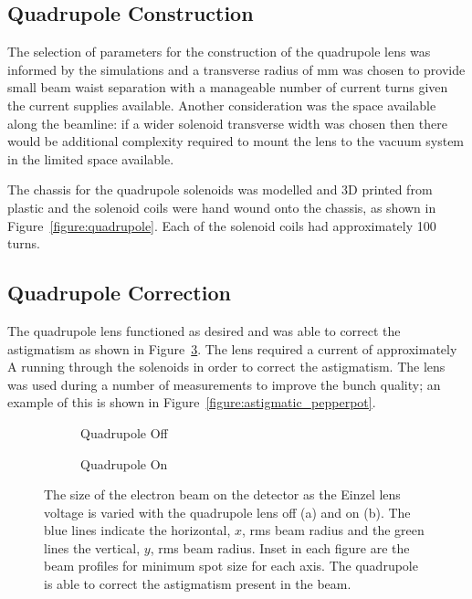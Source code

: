 \subsection{Quadrupole Construction}

The selection of parameters for the construction of the quadrupole lens was informed by the simulations and a transverse radius of \unit[35]{mm} was chosen to provide small beam waist separation with a manageable number of current turns given the current supplies available.
Another consideration was the space available along the beamline: if a wider solenoid transverse width was chosen then there would be additional complexity required to mount the lens to the vacuum system in the limited space available.

The chassis for the quadrupole solenoids was modelled and 3D printed from plastic and the solenoid coils were hand wound onto the chassis, as shown in Figure~\ref{figure:quadrupole}.
Each of the solenoid coils had approximately 100 turns.

\subsection{Quadrupole Correction}

The quadrupole lens functioned as desired and was able to correct the astigmatism as shown in Figure~\ref{figure:quadrupole_scans}.
The lens required a current of approximately \unit[1]{A} running through the solenoids in order to correct the astigmatism.
The lens was used during a number of measurements to improve the bunch quality; an example of this is shown in Figure~\ref{figure:astigmatic_pepperpot}. 

\begin{figure}
    \centering
    \begin{subfigure}{0.49\linewidth}
    \centering
    
    \caption{Quadrupole Off}
    \label{figure:quadrupole_scans_off}
    \end{subfigure}
    \begin{subfigure}{0.49\linewidth}
    \centering
    
    \caption{Quadrupole On}
    \label{figure:quadrupole_scans_on}
    \end{subfigure}
    \caption[Astigmatism correction.]{The size of the electron beam on the detector as the Einzel lens voltage is varied with the quadrupole lens off (a) and on (b). The blue lines indicate the horizontal, $x$, \gls{rms} beam radius and the green lines the vertical, $y$, \gls{rms} beam radius. Inset in each figure are the beam profiles for minimum spot size for each axis. The quadrupole is able to correct the astigmatism present in the beam.}
    \label{figure:quadrupole_scans}
\end{figure}

